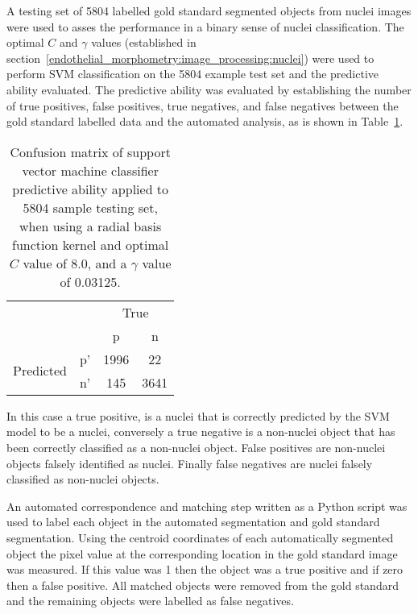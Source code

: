 A testing set of 5804 labelled gold standard segmented objects from nuclei images were used to asses the performance in a binary sense of nuclei classification. The optimal $C$ and $\gamma$ values (established in section~\ref{endothelial_morphometry:image_processing:nuclei}) were used to perform SVM classification on the 5804 example test set and the predictive ability evaluated. The predictive ability was evaluated by establishing the number of true positives, false positives, true negatives, and false negatives between the gold standard labelled data and the automated analysis, as is shown in Table~\ref{table:endothelial_morphometry:confusion_matrix}.

\begin{table}[htbp]
\caption[Confusion matrix of support vector machine nuclei predictive ability]{Confusion matrix of support vector machine classifier predictive ability applied to 5804 sample testing set, when using a radial basis function kernel and optimal $C$ value of 8.0, and a $\gamma$ value of 0.03125. }
\label{table:endothelial_morphometry:confusion_matrix}
\centering
\begin{tabular}{cc|cc}
	\multicolumn{2}{c}{}&\multicolumn{2}{c}{True}\\
	\multicolumn{2}{c|}{}& p & n\\
	\cline{2-4}
	\multirow{2}{*}{Predicted}& p' & 1996 & 22\\ & n' & 145 & 3641\\
\end{tabular}
\end{table}

In this case a true positive, is a nuclei that is correctly predicted by the SVM model to be a nuclei, conversely a true negative is a non-nuclei object that has been correctly classified as a non-nuclei object. False positives are non-nuclei objects falsely identified as nuclei. Finally false negatives are nuclei falsely classified as non-nuclei objects.

An automated correspondence and matching step written as a Python script was used to label each object in the automated segmentation and gold standard segmentation. Using the centroid coordinates of each automatically segmented object the pixel value at the corresponding location in the gold standard image was measured. If this value was 1 then the object was a true positive and if zero then a false positive. All matched objects were removed from the gold standard and the remaining objects were labelled as false negatives.

